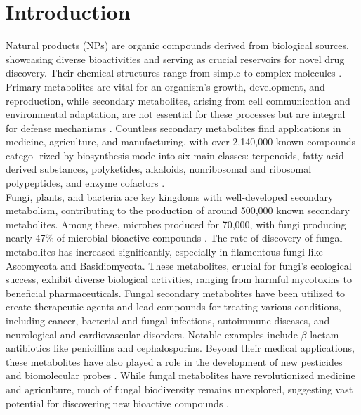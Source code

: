 \chapter{Introduction}
Natural products (NPs) are organic compounds derived from biological sources, showcasing
diverse bioactivities and serving as crucial reservoirs for novel drug discovery. Their chemical
structures range from simple to complex molecules \cite{Thirumurugan2018}. Primary metabolites are vital for an
organism’s growth, development, and reproduction, while secondary metabolites, arising from
cell communication and environmental adaptation, are not essential for these processes but are
integral for defense mechanisms \cite{MShuikan2021}. Countless secondary metabolites find applications in
medicine, agriculture, and manufacturing, with over 2,140,000 known compounds catego-
rized by biosynthesis mode into six main classes: terpenoids, fatty acid-derived substances,
polyketides, alkaloids, nonribosomal and ribosomal polypeptides, and enzyme cofactors \cite{Nicolaou2017}.\\


Fungi, plants, and bacteria are key kingdoms with well-developed secondary metabolism, contributing to the production of around 500,000 known secondary metabolites. 
Among these, microbes produced for 70,000, with fungi producing nearly 47\% of microbial bioactive compounds \cite{Bills2016}. The rate of discovery of fungal metabolites has increased significantly, especially in filamentous fungi like Ascomycota and Basidiomycota. These metabolites, crucial for fungi's ecological success, exhibit diverse biological activities, ranging from harmful mycotoxins to beneficial pharmaceuticals. Fungal secondary metabolites have been utilized to create therapeutic agents and lead compounds for treating various conditions, including cancer, bacterial and fungal infections, autoimmune diseases, and neurological and cardiovascular disorders. Notable examples include $\beta$-lactam antibiotics like penicillins and cephalosporins. Beyond their medical applications, these metabolites have also played a role in the development of new pesticides and biomolecular probes \cite{Bills2016}. While fungal metabolites have revolutionized medicine and agriculture, much of fungal biodiversity remains unexplored, suggesting vast potential for discovering new bioactive compounds \cite{Bills2016}.\\


